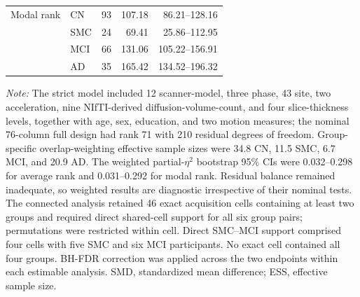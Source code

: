 \documentclass{article}
\begin{document}
\begin{table}[!htbp]
\begin{tabular}{llrrr}
\addlinespace
Modal rank & CN & 93 & 107.18 & 86.21--128.16\\
& SMC & 24 & 69.41 & 25.86--112.95\\
& MCI & 66 & 131.06 & 105.22--156.91\\
& AD & 35 & 165.42 & 134.52--196.32\\
\bottomrule
\end{tabular}
\par\vspace{1mm}
\footnotesize{\textit{Note:} The strict model included 12 scanner-model, three phase, 43 site, two acceleration, nine NIfTI-derived diffusion-volume-count, and four slice-thickness levels, together with age, sex, education, and two motion measures; the nominal 76-column full design had rank 71 with 210 residual degrees of freedom. Group-specific overlap-weighting effective sample sizes were 34.8 CN, 11.5 SMC, 6.7 MCI, and 20.9 AD. The weighted partial-$\eta^2$ bootstrap 95\% CIs were 0.032--0.298 for average rank and 0.031--0.292 for modal rank. Residual balance remained inadequate, so weighted results are diagnostic irrespective of their nominal tests. The connected analysis retained 46 exact acquisition cells containing at least two groups and required direct shared-cell support for all six group pairs; permutations were restricted within cell. Direct SMC--MCI support comprised four cells with five SMC and six MCI participants. No exact cell contained all four groups. BH-FDR correction was applied across the two endpoints within each estimable analysis. SMD, standardized mean difference; ESS, effective sample size.}
\end{table}
\end{document}
